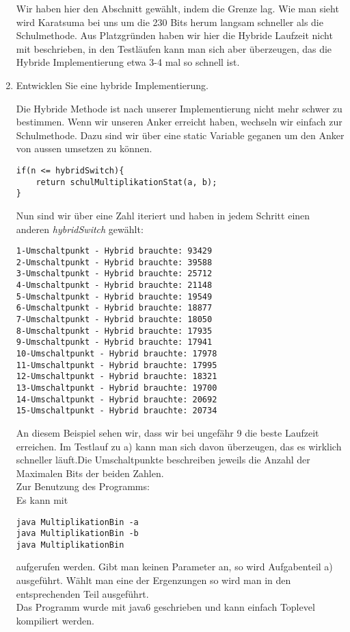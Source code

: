 \documentclass[11pt,a4paper,ngerman]{article}
\begin{document}
\begin{enumerate}[\bfseries (a)]
Wir haben hier den Abschnitt gewählt, indem die Grenze lag. Wie man sieht wird Karatsuma bei uns um die 230 Bits herum langsam schneller als die Schulmethode. Aus Platzgründen haben wir hier die Hybride Laufzeit nicht mit beschrieben, in den Testläufen kann man sich aber überzeugen, das die Hybride Implementierung etwa 3-4 mal so schnell ist.

\pagebreak

\item Entwicklen Sie eine hybride Implementierung.

Die Hybride Methode ist nach unserer Implementierung nicht mehr schwer zu bestimmen. Wenn wir unseren Anker erreicht haben, wechseln wir einfach zur Schulmethode. Dazu sind wir über eine static Variable geganen um den Anker von aussen umsetzen zu können.

\begin{lstlisting}
if(n <= hybridSwitch){
	return schulMultiplikationStat(a, b);
}	
\end{lstlisting}

Nun sind wir über eine Zahl iteriert und haben in jedem Schritt einen anderen \emph{hybridSwitch} gewählt:

\begin{lstlisting}
1-Umschaltpunkt - Hybrid brauchte: 93429
2-Umschaltpunkt - Hybrid brauchte: 39588
3-Umschaltpunkt - Hybrid brauchte: 25712
4-Umschaltpunkt - Hybrid brauchte: 21148
5-Umschaltpunkt - Hybrid brauchte: 19549
6-Umschaltpunkt - Hybrid brauchte: 18877
7-Umschaltpunkt - Hybrid brauchte: 18050
8-Umschaltpunkt - Hybrid brauchte: 17935
9-Umschaltpunkt - Hybrid brauchte: 17941
10-Umschaltpunkt - Hybrid brauchte: 17978
11-Umschaltpunkt - Hybrid brauchte: 17995
12-Umschaltpunkt - Hybrid brauchte: 18321
13-Umschaltpunkt - Hybrid brauchte: 19700
14-Umschaltpunkt - Hybrid brauchte: 20692
15-Umschaltpunkt - Hybrid brauchte: 20734
\end{lstlisting}

An diesem Beispiel sehen wir, dass wir bei ungefähr 9 die beste Laufzeit erreichen. Im Testlauf zu a) kann man sich davon überzeugen, das es wirklich schneller läuft.Die Umschaltpunkte beschreiben jeweils die Anzahl der Maximalen Bits der beiden Zahlen.\\

Zur Benutzung des Programms:\\
Es kann mit 
\begin{lstlisting}
java MultiplikationBin -a
java MultiplikationBin -b
java MultiplikationBin
\end{lstlisting}
aufgerufen werden. Gibt man keinen Parameter an, so wird Aufgabenteil a) ausgeführt. Wählt man eine der Ergenzungen so wird man in den entsprechenden Teil ausgeführt.\\

Das Programm wurde mit java6 geschrieben und kann einfach Toplevel kompiliert werden.
\end{enumerate}

\label{LastPage}
\end{document}
